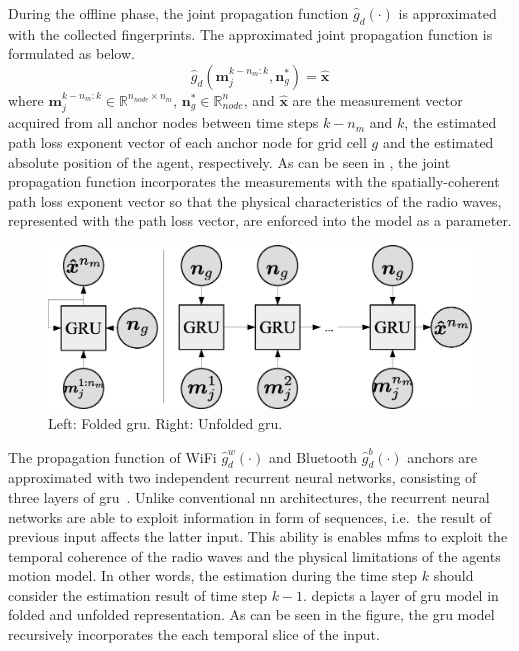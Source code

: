     During the offline phase, the joint propagation function $\hat{g}_d(\cdot)$ is approximated with the collected fingerprints.
    The approximated joint propagation function is formulated as below.
    \begin{equation}
        \label{eq:propfunct}
        \hat{g}_d(\bm{m}^{k-n_{m}:k}_j, \bm{n}^*_g)= \bm{\hat{x}}
    \end{equation}
    where $\bm{m}^{k-n_{m}:k}_j \in \mathbb{R}^{n_{node} \times n_m}$, $\bm{n}^*_g \in \mathbb{R}^n_{node}$, and $\bm{\hat{x}}$ are the measurement vector acquired from all anchor nodes between time steps $k-n_m$ and $k$, the estimated path loss exponent vector of each anchor node for grid cell $g$ and the estimated absolute position of the agent, respectively.
    As can be seen in , the joint propagation function incorporates the measurements with the spatially-coherent path loss exponent vector so that the physical characteristics of the radio waves, represented with the path loss vector, are enforced into the model as a parameter.

    \begin{figure}[thpb]
       \centering
       \includegraphics[width=0.9\linewidth]{figures/gru.eps}
       \caption{\label{fig:gru}Left: Folded \gls{gru}. Right: Unfolded \gls{gru}.}
    \end{figure}

    The propagation function of WiFi $\hat{g}^w_d(\cdot)$ and Bluetooth $\hat{g}^b_d(\cdot)$ anchors are approximated with two independent recurrent neural networks, consisting of three layers of \gls{gru}~\cite{cho2014learning}.
    Unlike conventional \gls{nn} architectures, the recurrent neural networks are able to exploit information in form of sequences, i.e.\ the result of previous input affects the latter input.
    This ability is enables \gls{mfms} to exploit the temporal coherence of the radio waves and the physical limitations of the agents motion model.
    In other words, the estimation during the time step $k$ should consider the estimation result of time step $k-1$.
     depicts a layer of \gls{gru} model in folded and unfolded representation.
    As can be seen in the figure, the \gls{gru} model recursively incorporates the each temporal slice of the input.


